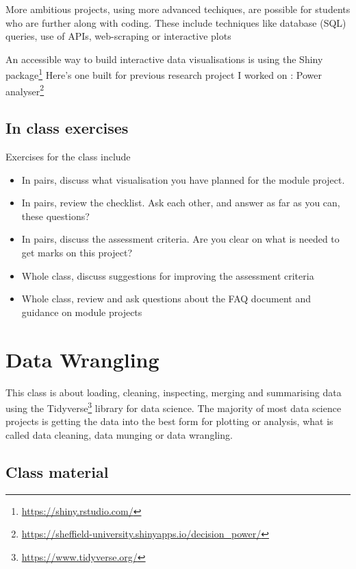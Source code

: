 \documentclass[
  12pt,
  a5paper,
]{book}
\DeclareRobustCommand{\href}[2]{#2\footnote{\url{#1}}}
\providecommand{\tightlist}{%
  \setlength{\itemsep}{0pt}\setlength{\parskip}{0pt}}
\begin{document}
More ambitious projects, using more advanced techiques, are possible for students who are further along with coding. These include techniques like database (SQL) queries, use of APIs, web-scraping or interactive plots

An accessible way to build interactive data visualisations is using the \href{https://shiny.rstudio.com/}{Shiny package} Here's one built for previous research project I worked on : \href{https://sheffield-university.shinyapps.io/decision_power/}{Power analyser}

\hypertarget{in-class-exercises}{%
\section{In class exercises}\label{in-class-exercises}}

Exercises for the class include

\begin{itemize}
\tightlist
\item
  In pairs, discuss what visualisation you have planned for the module project.
\item
  In pairs, review the checklist. Ask each other, and answer as far as you can, these questions?
\item
  In pairs, discuss the assessment criteria. Are you clear on what is needed to get marks on this project?
\item
  Whole class, discuss suggestions for improving the assessment criteria
\item
  Whole class, review and ask questions about the FAQ document and guidance on module projects
\end{itemize}

\hypertarget{data-wrangling}{%
\chapter{Data Wrangling}\label{data-wrangling}}

This class is about loading, cleaning, inspecting, merging and summarising data using the \href{https://www.tidyverse.org/}{Tidyverse} library for data science. The majority of most data science projects is getting the data into the best form for plotting or analysis, what is called data cleaning, data munging or data wrangling.

\hypertarget{class-material-2}{%
\section{Class material}\label{class-material-2}}
\end{document}
